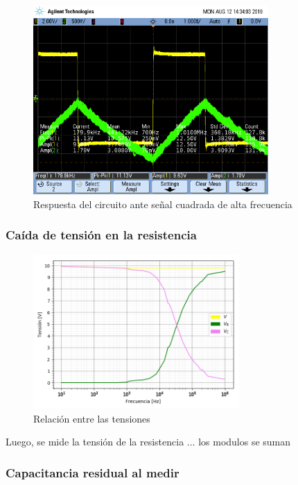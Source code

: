 \documentclass[11pt, a4paper]{article}
\begin{document}
\begin{figure}[h]
	\centering
	\includegraphics[width=0.8\textwidth,trim={0.5cm 5cm  1 5cm},clip]{rta_onda_cuadrada_alta_f.png}
	\caption{Respuesta del circuito ante señal cuadrada de alta frecuencia} 
	\label{graf:rta_onda_cuadrada_alta_f}
\end{figure}

\subsubsection*{Caída de tensión en la resistencia}

\begin{figure}[h]
	\centering
	\includegraphics[width=0.7\textwidth]{Tensiones.png}
	\caption{Relación entre las tensiones} 
	\label{graf:Tensiones}
\end{figure}

Luego, se mide la tensión de la resistencia ... los modulos se suman

\subsubsection*{Capacitancia residual al medir}
\end{document}
